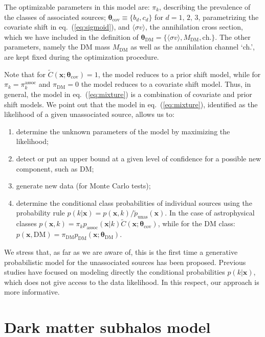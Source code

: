 \documentclass[12pt, a4paper]{article}
\newcommand{\ben}{\begin{enumerate}}
\newcommand{\een}{\end{enumerate}}
\newcommand{\bx}{\textbf{x}}
\newcommand{\btheta}{\boldsymbol{\theta}}
\newcommand{\sigmav}{\langle \sigma v \rangle}
\newcommand{\mdm}{{M_\textrm{DM}}}
\begin{document}
The optimizable parameters in this model are: $\pi_k$, describing the prevalence of the classes of associated sources; $\btheta_\textrm{cov}\equiv\{b_d,c_d\}$ for $d = 1,\,2,\,3$, parametrizing the covariate shift in eq.~(\ref{eq:sigmoid}), and $\sigmav$, the annihilation cross section, which we have included in the definition of $\btheta_\textrm{DM}=\{\sigmav,\mdm,\textrm{ch.}\}$. The other parameters, namely the DM mass $\mdm$ as well as the annihilation channel `ch.', are kept fixed during the optimization procedure.

Note that for $\tilde{C}(\bx; \btheta_\textrm{cov}) = 1$, the model reduces to a prior shift model, while for $\pi_k = \pi_k^\textrm{assoc}$ and $\pi_\textrm{DM} = 0$ the model reduces to a covariate shift model.
Thus, in general, the model in eq.~(\ref{eq:mixture}) is a combination of covariate and prior shift models. We point out that the model in eq.~(\ref{eq:mixture}), identified as the likelihood of a given unassociated source, allows us to:
\ben
\item
determine the unknown parameters of the model by maximizing the likelihood;
\item
detect or put an upper bound at a given level of confidence for a possible new component, such as DM;
\item
generate new data (for Monte Carlo tests);
\item
determine the conditional class probabilities of individual sources using the probability rule
$p(k|\bx) = p(\bx, k)/\tilde{p}_\textrm{unas}(\bx)$. In the case of astrophysical classes 
$p(\bx, k) = \pi_k p_\textrm{assoc}(\bx|k) \tilde{C}(\bx; \btheta_\textrm{cov})$, while
for the DM class: $p(\bx, \textrm{DM}) = \pi_\textrm{DM} p_\textrm{DM}(\bx; \btheta_\textrm{DM})$.
\een

We stress that, as far as we are aware of, this is the first time a generative probabilistic model for the unassociated sources has been proposed. Previous studies have focused on modeling directly the conditional probabilities $p(k|\bx)$, which does not give access to the data likelihood. In this respect, our approach is more informative.

\section{Dark matter subhalos model}
\label{sec:DM_model_chapter}
\end{document}
